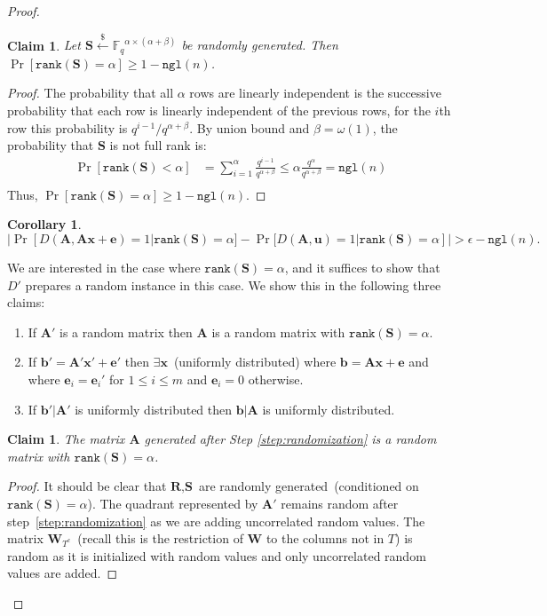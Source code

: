\documentclass[11pt]{article}
\newcommand{\vect}[1]{\ensuremath{\textbf{#1}}}
\newcommand{\Fq}{\ensuremath{\mathbb{F}_q}}
\newcommand{\rank}{\ensuremath{\mathtt{rank}}\xspace}
\newcommand{\ngl}{\ensuremath{\mathtt{ngl}}\xspace}
\newtheorem{corollary}[theorem]{Corollary}
\newtheorem{claim}[theorem]{Claim}
\newcommand{\authnote}[2]{{\textcolor{red}{\textsf{#1 notes: }\textcolor{blue}{ #2}}\marginpar{\textcolor{red}{\textbf{!!!!!}}}}}
\newcommand{\authnote}[2]{}
\newcommand{\bnote}[1]{{\authnote{Ben}{#1}}}
\newcommand{\ve}{\vect{e}}
\newcommand{\vS}{\vect{S}}
\newcommand{\vA}{\vect{A}}
\newcommand{\vW}{\vect{W}}
\newcommand{\vR}{\vect{R}}
\newcommand{\vx}{\vect{x}}
\newcommand{\vb}{\vect{b}}
\newcommand{\vu}{\vect{u}}
\begin{document}
\begin{proof}
\begin{claim}
\label{cl:full rank matrix}
Let $\vS \overset{\$}\leftarrow \Fq^{\alpha \times (\alpha+\beta)}$ be randomly generated.  Then $\Pr[\rank(\vS)=\alpha]\geq  1- \ngl(n)$.
\end{claim}
\begin{proof}
The probability that all $\alpha$ rows are linearly independent is the successive probability that each row is linearly independent of the previous rows, for the $i$th row this probability is $q^{i-1}/q^{\alpha+\beta}$.  By union bound and $\beta = \omega(1)$, the probability that $\vS$ is not full rank is:
\begin{align*}
\Pr[\rank(\vS) < \alpha] &= \sum_{i=1}^{\alpha} \frac{q^{i-1}}{q^{\alpha+\beta}}
\leq \alpha \frac{q^{\alpha}}{q^{\alpha+\beta} }=\ngl(n)\\
\end{align*}
Thus, $\Pr[\rank(\vS) = \alpha] \geq 1-\ngl(n)$.
\end{proof}
\begin{corollary}
$
|\Pr[D(\vA, \vA\vx+\ve) = 1  | \rank(\vS) = \alpha] - \Pr[D(\vA, \vu) =1 | \rank(\vS) = \alpha]|> \epsilon - \ngl(n).
$
\end{corollary}

We are interested in the case where $\rank(\vS) = \alpha$, and it suffices to show that $D'$ prepares a random instance in this case. We show this in the following three claims: 
\begin{enumerate}
\item If $\vA'$ is a random matrix then $\vA$ is a random matrix with $\rank(\vS) = \alpha$.
\item If $\vb' = \vA'\vx'+\ve'$ then $\exists \vx$~(uniformly distributed) where $\vb = \vA \vx + \ve$ and where $\ve_i = \ve_i'$ for $1\leq i\leq m$ and $\ve_i = 0$ otherwise.
\item If $\vb' | \vA'$ is uniformly distributed then $\vb | \vA$ is uniformly distributed.
\end{enumerate}

\begin{claim}
\label{cl:randomMatrixDist}
The matrix $\vA$ generated after Step \ref{step:randomization} is a random matrix with $\rank(\vS) = \alpha$.
\end{claim}
\begin{proof}
It should be clear that $\vR, \vS$ are randomly generated~(conditioned on $\rank(\vS) =\alpha$).  The quadrant represented by $\vA'$ remains random after step~\ref{step:randomization} as we are adding uncorrelated random values.  
The matrix $\vW_{T^c}$~(recall this is the restriction of $\vW$ to the columns not in $T$) is random as it is initialized with random values and only uncorrelated random values are added.


\end{proof}
\end{proof}
\end{document}
